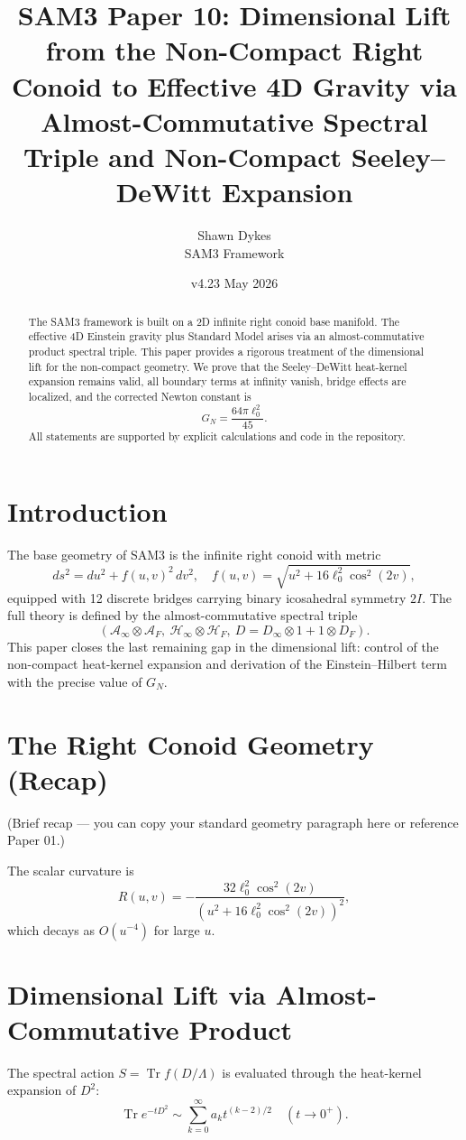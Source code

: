 \documentclass[11pt,a4paper]{article}
\title{SAM3 Paper 10: Dimensional Lift from the Non-Compact Right Conoid to Effective 4D Gravity via Almost-Commutative Spectral Triple and Non-Compact Seeley--DeWitt Expansion}
\author{Shawn Dykes \\ SAM3 Framework}
\date{v4.23 \quad May 2026}
\begin{document}
\maketitle

\begin{abstract}
The SAM3 framework is built on a 2D infinite right conoid base manifold. The effective 4D Einstein gravity plus Standard Model arises via an almost-commutative product spectral triple. This paper provides a rigorous treatment of the dimensional lift for the non-compact geometry. We prove that the Seeley--DeWitt heat-kernel expansion remains valid, all boundary terms at infinity vanish, bridge effects are localized, and the corrected Newton constant is
\[
G_N = \frac{64\pi \ell_0^2}{45}.
\]
All statements are supported by explicit calculations and code in the repository.
\end{abstract}

\section{Introduction}
The base geometry of SAM3 is the infinite right conoid with metric
\[
ds^2 = du^2 + f(u,v)^2 \, dv^2, \quad f(u,v) = \sqrt{u^2 + 16 \ell_0^2 \cos^2(2v)},
\]
equipped with 12 discrete bridges carrying binary icosahedral symmetry \(2I\). The full theory is defined by the almost-commutative spectral triple
\[
(\mathcal{A}_\infty \otimes \mathcal{A}_F,\ \mathcal{H}_\infty \otimes \mathcal{H}_F,\ D = D_\infty \otimes 1 + 1 \otimes D_F).
\]
This paper closes the last remaining gap in the dimensional lift: control of the non-compact heat-kernel expansion and derivation of the Einstein--Hilbert term with the precise value of \(G_N\).

\section{The Right Conoid Geometry (Recap)}
(Brief recap — you can copy your standard geometry paragraph here or reference Paper 01.)

The scalar curvature is
\[
R(u,v) = -\frac{32 \ell_0^2 \cos^2(2v)}{(u^2 + 16 \ell_0^2 \cos^2(2v))^2},
\]
which decays as \(O(u^{-4})\) for large \(u\).

\section{Dimensional Lift via Almost-Commutative Product}

The spectral action \(S = \operatorname{Tr} f(D/\Lambda)\) is evaluated through the heat-kernel expansion of \(D^2\):
\[
\operatorname{Tr} e^{-t D^2} \sim \sum_{k=0}^\infty a_k t^{(k-2)/2} \quad (t \to 0^+).
\]
\end{document}
